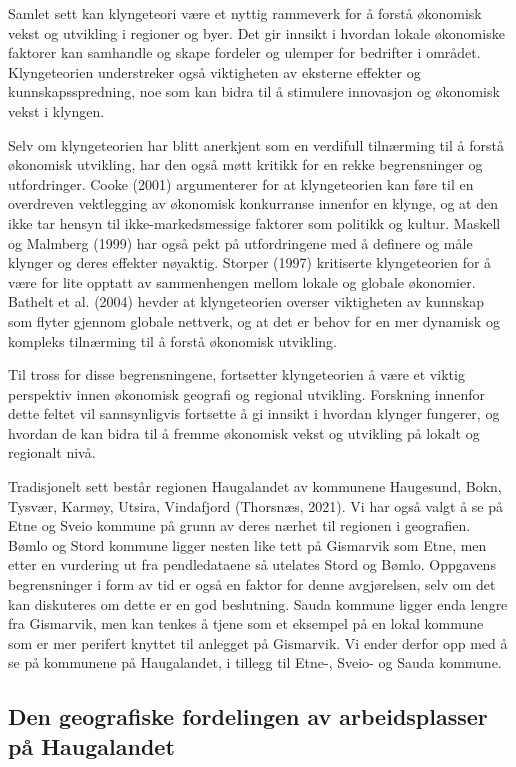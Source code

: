 \documentclass[
]{article}
\begin{document}
Samlet sett kan klyngeteori være et nyttig rammeverk for å forstå
økonomisk vekst og utvikling i regioner og byer. Det gir innsikt i
hvordan lokale økonomiske faktorer kan samhandle og skape fordeler og
ulemper for bedrifter i området. Klyngeteorien understreker også
viktigheten av eksterne effekter og kunnskapsspredning, noe som kan
bidra til å stimulere innovasjon og økonomisk vekst i klyngen.

Selv om klyngeteorien har blitt anerkjent som en verdifull tilnærming
til å forstå økonomisk utvikling, har den også møtt kritikk for en rekke
begrensninger og utfordringer. Cooke (2001) argumenterer for at
klyngeteorien kan føre til en overdreven vektlegging av økonomisk
konkurranse innenfor en klynge, og at den ikke tar hensyn til
ikke-markedsmessige faktorer som politikk og kultur. Maskell og Malmberg
(1999) har også pekt på utfordringene med å definere og måle klynger og
deres effekter nøyaktig. Storper (1997) kritiserte klyngeteorien for å
være for lite opptatt av sammenhengen mellom lokale og globale
økonomier. Bathelt et al. (2004) hevder at klyngeteorien overser
viktigheten av kunnskap som flyter gjennom globale nettverk, og at det
er behov for en mer dynamisk og kompleks tilnærming til å forstå
økonomisk utvikling.

Til tross for disse begrensningene, fortsetter klyngeteorien å være et
viktig perspektiv innen økonomisk geografi og regional utvikling.
Forskning innenfor dette feltet vil sannsynligvis fortsette å gi innsikt
i hvordan klynger fungerer, og hvordan de kan bidra til å fremme
økonomisk vekst og utvikling på lokalt og regionalt nivå.

Tradisjonelt sett består regionen Haugalandet av kommunene Haugesund,
Bokn, Tysvær, Karmøy, Utsira, Vindafjord (Thorsnæs, 2021). Vi har også
valgt å se på Etne og Sveio kommune på grunn av deres nærhet til
regionen i geografien. Bømlo og Stord kommune ligger nesten like tett på
Gismarvik som Etne, men etter en vurdering ut fra pendledataene så
utelates Stord og Bømlo. Oppgavens begrensninger i form av tid er også
en faktor for denne avgjørelsen, selv om det kan diskuteres om dette er
en god beslutning. Sauda kommune ligger enda lengre fra Gismarvik, men
kan tenkes å tjene som et eksempel på en lokal kommune som er mer
perifert knyttet til anlegget på Gismarvik. Vi ender derfor opp med å se
på kommunene på Haugalandet, i tillegg til Etne-, Sveio- og Sauda
kommune.

\hypertarget{den-geografiske-fordelingen-av-arbeidsplasser-puxe5-haugalandet}{%
\subsection{Den geografiske fordelingen av arbeidsplasser på
Haugalandet}\label{den-geografiske-fordelingen-av-arbeidsplasser-puxe5-haugalandet}}
\end{document}
